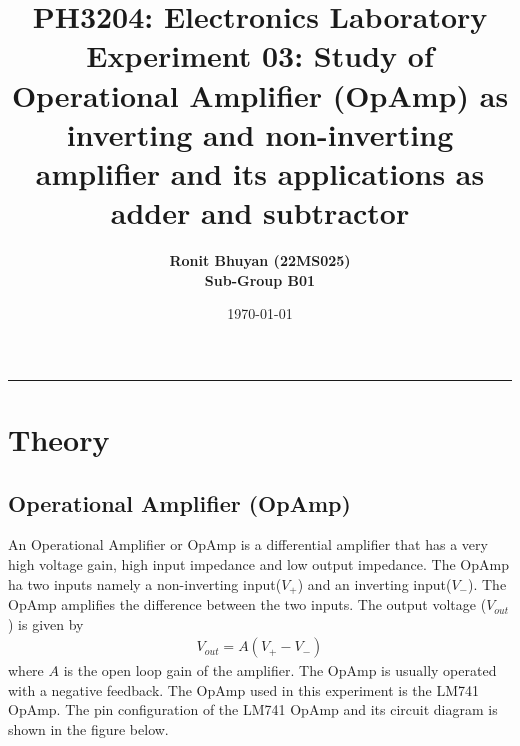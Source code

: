 \documentclass[12pt]{article}
\title{
  \vspace{-2cm}
  \Huge \textbf{PH3204: Electronics Laboratory} \\[0.4cm]
  \Large \textbf{Experiment 03:  Study of Operational Amplifier 
  (OpAmp) as inverting and non-inverting amplifier and
  its applications as adder and subtractor}
}
\author{
  \textbf{Ronit Bhuyan (22MS025)} \\[0.2cm]
  \textbf{Sub-Group B01}
}
\date{\today}
\begin{document}
\maketitle

\tableofcontents
\noindent\rule{\textwidth}{0.4pt}
\newpage

\section{Theory}


\subsection{Operational Amplifier (OpAmp)}
An Operational Amplifier or OpAmp is a differential amplifier that has a very high voltage gain, high input impedance and low output impedance. The OpAmp ha two inputs namely a non-inverting input($V_+$) and an inverting input($V_-$). The OpAmp amplifies the difference between the two inputs. The output voltage ($V_{out}$) is given by 
\begin{align*}
    V_{out} = A(V_+ - V_-)
\end{align*} 
where $A$ is the open loop gain of the amplifier. The OpAmp is usually operated with a negative feedback. The OpAmp used in this experiment is the LM741 OpAmp. The pin configuration of the LM741 OpAmp and its circuit diagram is shown in the figure below.
\end{document}
